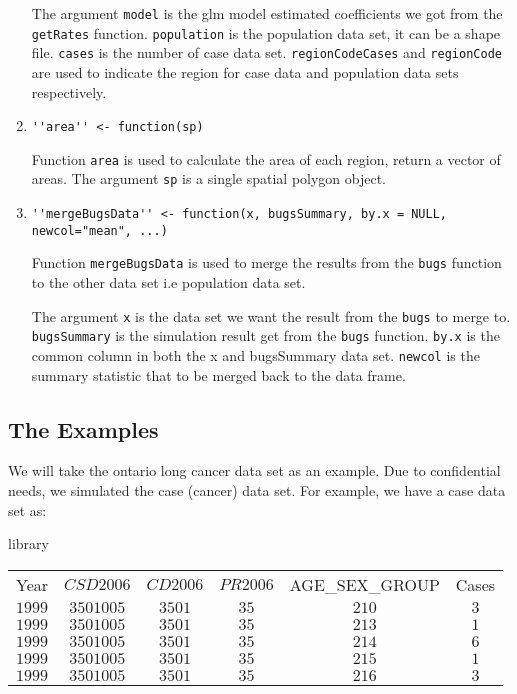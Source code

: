 \documentclass{article}
\begin{document}
\begin{enumerate}
The argument \texttt{model} is the glm model estimated coefficients we got from the \texttt{getRates} function.
\texttt{population} is the population data set, it can be a shape file. \texttt{cases} is the number of
case data set. \texttt{regionCodeCases} and \texttt{regionCode} are used to indicate the region for case data and
population data sets respectively.

\item 
\begin{verbatim}
''area'' <- function(sp)
\end{verbatim}
Function \texttt{area} is used to calculate the area of each region, return a vector of areas. The argument \texttt{sp} is a single 
spatial polygon object.
\item 
\begin{verbatim}
''mergeBugsData'' <- function(x, bugsSummary, by.x = NULL, newcol="mean", ...) 
\end{verbatim}
Function \texttt{mergeBugsData} is used to merge the results from the \texttt{bugs} function to the other data set i.e population data set.

The argument \texttt{x} is the data set we want the result from the \texttt{bugs} to merge to. \texttt{bugsSummary} is the simulation result
get from the \texttt{bugs} function. \texttt{by.x} is the common column in both the {x} and {bugsSummary} data set. \texttt{newcol} is the summary statistic that to be merged back to the data frame.   
\end{enumerate}


\subsection{The Examples}
We will take the ontario long cancer data set as an example. Due to confidential needs, we simulated the case (cancer) data set.  
For example, we have a case data set as:


library
\begin{table}[ht]
\begin{center}
\begin{tabular}{cccccc}
Year& $CSD2006$ & $CD2006$ & $PR2006$ & AGE\_SEX\_GROUP & Cases \\
$1999$&$3501005$&$3501$&$35$&$210$&$3$ \\
$1999$&$3501005$&$3501$&$35$&$213$&$1$ \\
$1999$&$3501005$&$3501$&$35$&$214$&$6$ \\
$1999$&$3501005$&$3501$&$35$&$215$&$1$ \\
$1999$&$3501005$&$3501$&$35$&$216$&$3$ \\
\end{tabular}
\end{center}
\end{table}
\end{document}
